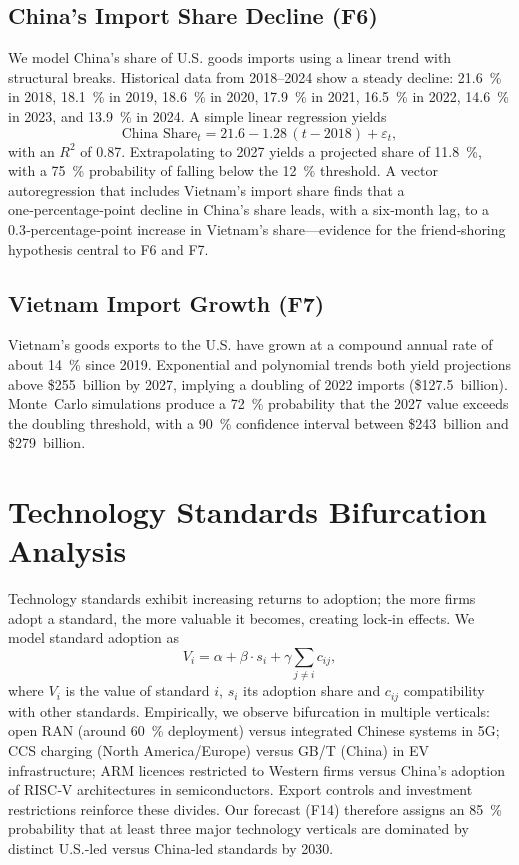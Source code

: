 \documentclass[12pt]{article}
\begin{document}
\subsection{China’s Import Share Decline (F6)}

We model China’s share of U.S. goods imports using a linear trend with structural breaks.  Historical data from 2018–2024 show a steady decline: 21.6 \% in 2018, 18.1 \% in 2019, 18.6 \% in 2020, 17.9 \% in 2021, 16.5 \% in 2022, 14.6 \% in 2023, and 13.9 \% in 2024.  A simple linear regression yields
\begin{equation}
\text{China Share}_{t} = 21.6 - 1.28\,(t-2018) + \varepsilon_t,
\end{equation}
with an $R^2$ of 0.87.  Extrapolating to 2027 yields a projected share of 11.8 \%, with a 75 \% probability of falling below the 12 \% threshold.  A vector autoregression that includes Vietnam’s import share finds that a one‑percentage‑point decline in China’s share leads, with a six‑month lag, to a 0.3‑percentage‑point increase in Vietnam’s share—evidence for the friend‑shoring hypothesis central to F6 and F7.

\subsection{Vietnam Import Growth (F7)}

Vietnam’s goods exports to the U.S. have grown at a compound annual rate of about 14 \% since 2019.  Exponential and polynomial trends both yield projections above \$255 billion by 2027, implying a doubling of 2022 imports (\$127.5 billion).  Monte Carlo simulations produce a 72 \% probability that the 2027 value exceeds the doubling threshold, with a 90 \% confidence interval between \$243 billion and \$279 billion.

\section{Technology Standards Bifurcation Analysis}

Technology standards exhibit increasing returns to adoption; the more firms adopt a standard, the more valuable it becomes, creating lock‑in effects.  We model standard adoption as
\begin{equation}
V_i = \alpha + \beta \cdot s_i + \gamma \sum_{j \neq i} c_{ij},
\end{equation}
where $V_i$ is the value of standard $i$, $s_i$ its adoption share and $c_{ij}$ compatibility with other standards.  Empirically, we observe bifurcation in multiple verticals: open RAN (around 60 \% deployment) versus integrated Chinese systems in 5G; CCS charging (North America/Europe) versus GB/T (China) in EV infrastructure; ARM licences restricted to Western firms versus China’s adoption of RISC‑V architectures in semiconductors.  Export controls and investment restrictions reinforce these divides.  Our forecast (F14) therefore assigns an 85 \% probability that at least three major technology verticals are dominated by distinct U.S.-led versus China‑led standards by 2030.
\end{document}
